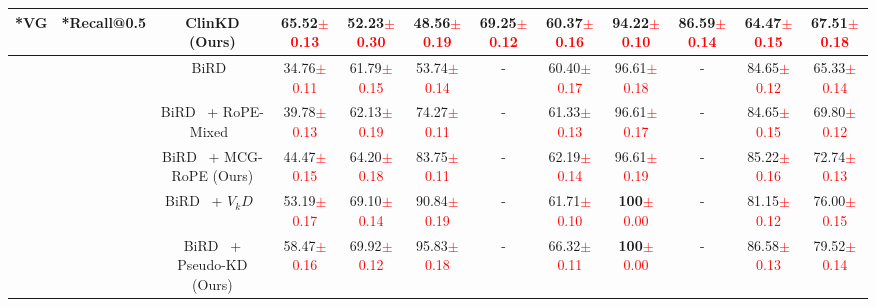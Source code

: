 \begin{table*}[t]
{\begin{tabular}{c|c|c|cccccccc|c}
\rowcolor[RGB]{255,245,235}
\cellcolor{white}\multirow{-6}*{\textbf{VG}}   &\cellcolor{white} \multirow{-6}*{Recall@0.5} & ClinKD (Ours) & \textbf{65.52}\textcolor{red}{$\pm$0.13} & \textbf{52.23}\textcolor{red}{$\pm$0.30} & \textbf{48.56}\textcolor{red}{$\pm$0.19} & \textbf{69.25}\textcolor{red}{$\pm$0.12} & \textbf{60.37}\textcolor{red}{$\pm$0.16} & \textbf{94.22}\textcolor{red}{$\pm$0.10} & \textbf{86.59}\textcolor{red}{$\pm$0.14} & \textbf{64.47}\textcolor{red}{$\pm$0.15} & \textbf{67.51}\textcolor{red}{$\pm$0.18} \\ \midrule

~   & ~ &BiRD~\cite{huang2024BiRD}& 34.76\textcolor{red}{$\pm$0.11} & 61.79\textcolor{red}{$\pm$0.15} & 53.74\textcolor{red}{$\pm$0.14} &  -     & 60.40\textcolor{red}{$\pm$0.17} & 96.61\textcolor{red}{$\pm$0.18}     & -     & 84.65\textcolor{red}{$\pm$0.12}     &  65.33\textcolor{red}{$\pm$0.14}  \\
~   & ~ &BiRD~\cite{huang2024BiRD} + RoPE-Mixed~\cite{heo2024rotarypositionembeddingvision} & 39.78\textcolor{red}{$\pm$0.13} & 62.13\textcolor{red}{$\pm$0.19} & 74.27\textcolor{red}{$\pm$0.11} &  -     & 61.33\textcolor{red}{$\pm$0.13} & 96.61\textcolor{red}{$\pm$0.17}     & -     & 84.65\textcolor{red}{$\pm$0.15}     &  69.80\textcolor{red}{$\pm$0.12}  \\
\rowcolor[RGB]{237,238,254}
\cellcolor{white}~   &\cellcolor{white} ~ &BiRD~\cite{huang2024BiRD} + MCG-RoPE (Ours)& 44.47\textcolor{red}{$\pm$0.15} & 64.20\textcolor{red}{$\pm$0.18} & 83.75\textcolor{red}{$\pm$0.11} &  -     & 62.19\textcolor{red}{$\pm$0.14} & 96.61\textcolor{red}{$\pm$0.19}     & -     & 85.22\textcolor{red}{$\pm$0.16}     &  72.74\textcolor{red}{$\pm$0.13}  \\
~   & ~ &BiRD~\cite{huang2024BiRD} + $V_{k}D$~\cite{Miles_2024_CVPR}& 53.19\textcolor{red}{$\pm$0.17} & 69.10\textcolor{red}{$\pm$0.14} & 90.84\textcolor{red}{$\pm$0.19} &  -     & 61.71\textcolor{red}{$\pm$0.10} & \textbf{100}\textcolor{red}{$\pm$0.00}     & -     & 81.15\textcolor{red}{$\pm$0.12}     &  76.00\textcolor{red}{$\pm$0.15}  \\
\rowcolor[RGB]{237,238,254}
\cellcolor{white}~   & \cellcolor{white}~ &BiRD~\cite{huang2024BiRD} + Pseudo-KD (Ours) & 58.47\textcolor{red}{$\pm$0.16} & 69.92\textcolor{red}{$\pm$0.12} & 95.83\textcolor{red}{$\pm$0.18} &  -     & 66.32\textcolor{red}{$\pm$0.11} & \textbf{100}\textcolor{red}{$\pm$0.00}     & -     & 86.58\textcolor{red}{$\pm$0.13}     &  79.52\textcolor{red}{$\pm$0.14}  \\

\end{tabular}}
\end{table*}
